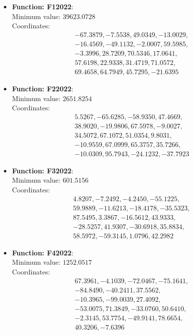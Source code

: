 \documentclass{article}
\begin{document}
\begin{itemize}
  \item \textbf{Function: F12022}: \\
    Minimum value: $39623.0728$ \\
    Coordinates:
    \[
      \begin{aligned}
        & -67.3879,  -7.5538,  49.0349, -13.0029, \\
        & -16.4569,  -49.1132,  -2.0007, 59.5985, \\
        & -3.3996,  28.7209,  70.5346, 17.0641,   \\
        & 57.6198,  22.9338,  31.4719, 71.0572,   \\
        & 69.4658,  64.7949,  45.7295, -21.6395
      \end{aligned}
    \]

  \item \textbf{Function: F22022}: \\
    Minimum value: $2651.8254$ \\
    Coordinates:
    \[
      \begin{aligned}
        & 5.5267,  -65.6285,  -58.9350, 47.4669,  \\
        & 38.9020,  -19.9806,  67.5978, -9.0027,  \\
        & 34.5072,  67.1072,  51.0354, 9.8031,    \\
        & -10.9559,  67.0999,  65.3757, 35.7266,  \\
        & -10.0309,  95.7943,  -24.1232, -37.7923
      \end{aligned}
    \]

  \item \textbf{Function: F32022}: \\
    Minimum value: $601.5156$ \\
    Coordinates:
    \[
      \begin{aligned}
        & 4.8207,  -7.2492,  -4.2450, -55.1225,    \\
        & 59.9889,  -11.6213,  -18.4178, -35.5323, \\
        & 87.5495,  3.3867,  -16.5612, 43.9333, \\
        & -28.5257,  41.9307,  -30.6918, 35.8834, \\
        & 58.5972,  -59.3145,  1.0796, 42.2982
      \end{aligned}
    \]

  \item \textbf{Function: F42022}: \\
    Minimum value: $1252.0517$ \\
    Coordinates:
    \[
      \begin{aligned}
        & 67.3961,  -4.1039,  -72.0467, -75.1641, \\
        & -84.8490,  -40.2411,  37.5562, \\
        & -10.3965,  -99.0039,  27.4092, \\
        & -53.0075, 71.3849,  -33.0760,  50.6410, \\
        & -2.3145, 53.7754,  -49.9141,  78.6654, \\
        & 40.3206, -7.6396
      \end{aligned}
    \]


\end{itemize}
\end{document}
